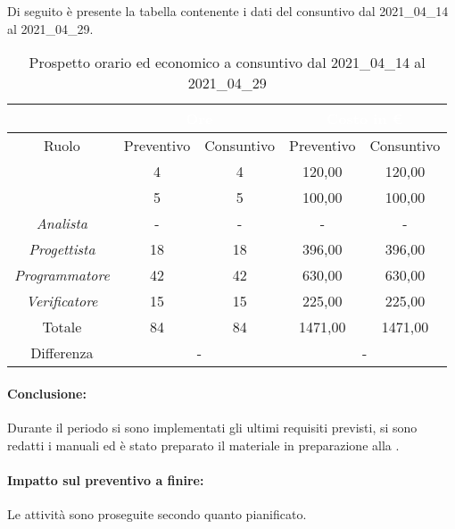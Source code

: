 Di seguito è presente la tabella contenente i dati del consuntivo dal 2021\_04\_14 al 2021\_04\_29.
\begin{table}[H]
	\centering
	\begin{tabular}{|c|c|c|c|c|}
		\rowcolor{darkblue} 
		&\multicolumn{2}{c|}{\textcolor{white}{Ore}}&\multicolumn{2}{c|}{\textcolor{white}{Costo in €}}\\ \hline
		Ruolo				&	Preventivo			&	Consuntivo		&	Preventivo	&	Consuntivo\\ \hline
		{\Responsabile}		&	4					&	4				&	120,00			&	120,00 \\ \hline
		{\Amministratore}	&	5					&	5				&	100,00			&	100,00 \\ \hline
		\textit{Analista}	&	-					&	-				&	-			&	- \\ \hline
		\textit{Progettista}& 	18					&   18 				& 	396,00			&  	396,00 \\ \hline
		\textit{Programmatore}& 42					& 	42				& 	630,00		&  	630,00 \\ \hline
		\textit{Verificatore}&	15					&	15				&	225,00			&	225,00 \\ \hline
		Totale				&	84					&	84				&	1471,00		&	1471,00 \\ \hline
		Differenza			& 	\multicolumn{2}{c|}{-} 					&\multicolumn{2}{c|}{-}\\ \hline
	\end{tabular}
	\caption{Prospetto orario ed economico a consuntivo dal 2021\_04\_14 al 2021\_04\_29}
\end{table}
\paragraph*{Conclusione:}
Durante il periodo si sono implementati gli ultimi requisiti previsti, si sono redatti i manuali ed è stato preparato il materiale in preparazione alla .
\paragraph*{Impatto sul preventivo a finire:}
Le attività sono proseguite secondo quanto pianificato.
